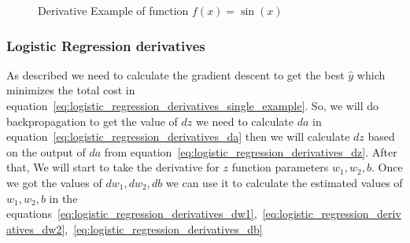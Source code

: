 


\begin{figure}[!h]
\begin{center}

\caption{Derivative Example of function $f(x) = \sin(x)$ }\label{fig:alpha_change}
\end{center}
\end{figure} 


\newpage
  \subsubsection{Logistic Regression derivatives}\label{logistic_bp_derivatives}

  As described we need to calculate the gradient descent to get the best $\widehat{y}$ which minimizes the total cost in equation~\eqref{eq:logistic_regression_derivatives_single_example}. So, we will do backpropagation to get the value of $dz$ we need to calculate $da$ in equation~\eqref{eq:logistic_regression_derivatives_da} then we will calculate $dz$ based on the output of $da$ from equation~\eqref{eq:logistic_regression_derivatives_dz}. After that, We will start to take the derivative for $z$ function parameters \textbf{\textit{$w_1,w_2,b$}}. Once we got the values of \textbf{\textit{$dw_1,dw_2,db$}} we can use it to calculate the estimated values of \textbf{\textit{$w_1,w_2,b$}} in the equations~\eqref{eq:logistic_regression_derivatives_dw1},~\eqref{eq:logistic_regression_derivatives_dw2},~\eqref{eq:logistic_regression_derivatives_db}

